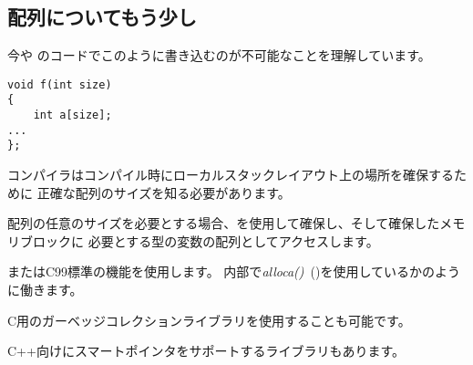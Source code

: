 ﻿\subsection{配列についてもう少し}

今や \CCpp のコードでこのように書き込むのが不可能なことを理解しています。

\begin{lstlisting}[style=customc]
void f(int size)
{
    int a[size];
...
};
\end{lstlisting}


コンパイラはコンパイル時にローカルスタックレイアウト上の場所を確保するために
正確な配列のサイズを知る必要があります。


配列の任意のサイズを必要とする場合、を使用して確保し、そして確保したメモリブロックに
必要とする型の変数の配列としてアクセスします。

またはC99標準の機能を使用します。
内部で\emph{alloca()}~()を使用しているかのように働きます。

C用のガーベッジコレクションライブラリを使用することも可能です。

C++向けにスマートポインタをサポートするライブラリもあります。
